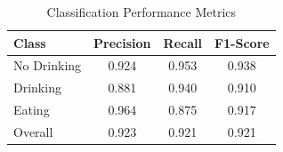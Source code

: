 
\begin{table}[h]
\centering
\caption{Classification Performance Metrics}
\label{tab:classification_metrics}
\large  %
\begin{tabular}{l|ccc}
\hline
\textbf{Class} & \textbf{Precision} & \textbf{Recall} & \textbf{F1-Score} \\
\hline
No Drinking & 0.924 & 0.953 & 0.938 \\
Drinking & 0.881 & 0.940 & 0.910 \\
Eating & 0.964 & 0.875 & 0.917 \\
\hline
Overall & 0.923 & 0.921 & 0.921 \\
\hline
\end{tabular}
\end{table}
